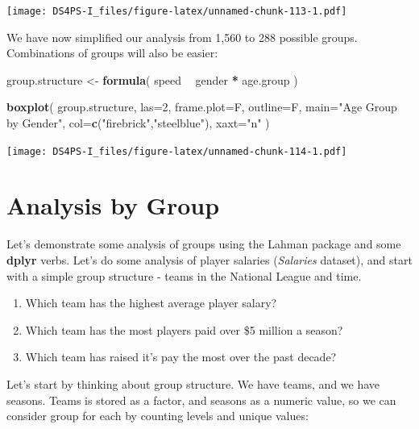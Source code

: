 \documentclass[]{book}
\newenvironment{Shaded}{\begin{snugshade}}{\end{snugshade}}
\newcommand{\DataTypeTok}[1]{\textcolor[rgb]{0.13,0.29,0.53}{#1}}
\newcommand{\DecValTok}[1]{\textcolor[rgb]{0.00,0.00,0.81}{#1}}
\newcommand{\KeywordTok}[1]{\textcolor[rgb]{0.13,0.29,0.53}{\textbf{#1}}}
\newcommand{\NormalTok}[1]{#1}
\newcommand{\OperatorTok}[1]{\textcolor[rgb]{0.81,0.36,0.00}{\textbf{#1}}}
\newcommand{\StringTok}[1]{\textcolor[rgb]{0.31,0.60,0.02}{#1}}
\providecommand{\tightlist}{%
  \setlength{\itemsep}{0pt}\setlength{\parskip}{0pt}}
\theoremstyle{definition}
\theoremstyle{definition}
\theoremstyle{definition}
\theoremstyle{remark}
\begin{document}
\texttt{[image: DS4PS-I\_files/figure-latex/unnamed-chunk-113-1.pdf]}

We have now simplified our analysis from 1,560 to 288 possible groups.
Combinations of groups will also be easier:

\begin{Shaded}
\begin{Highlighting}[]
\NormalTok{group.structure <-}\StringTok{ }\KeywordTok{formula}\NormalTok{( speed }\OperatorTok{~}\StringTok{ }\NormalTok{gender }\OperatorTok{*}\StringTok{ }\NormalTok{age.group )}

\KeywordTok{boxplot}\NormalTok{( group.structure, }
         \DataTypeTok{las=}\DecValTok{2}\NormalTok{, }\DataTypeTok{frame.plot=}\NormalTok{F, }\DataTypeTok{outline=}\NormalTok{F, }\DataTypeTok{main=}\StringTok{"Age Group by Gender"}\NormalTok{,}
         \DataTypeTok{col=}\KeywordTok{c}\NormalTok{(}\StringTok{"firebrick"}\NormalTok{,}\StringTok{"steelblue"}\NormalTok{), }\DataTypeTok{xaxt=}\StringTok{"n"}\NormalTok{ )}
\end{Highlighting}
\end{Shaded}

\texttt{[image: DS4PS-I\_files/figure-latex/unnamed-chunk-114-1.pdf]}

\hypertarget{analysis-by-group}{%
\section{Analysis by Group}\label{analysis-by-group}}

Let's demonstrate some analysis of groups using the Lahman package and
some \textbf{dplyr} verbs. Let's do some analysis of player salaries
(\emph{Salaries} dataset), and start with a simple group structure -
teams in the National League and time.

\begin{enumerate}
\def\labelenumi{\arabic{enumi}.}
\tightlist
\item
  Which team has the highest average player salary?
\item
  Which team has the most players paid over \$5 million a season?
\item
  Which team has raised it's pay the most over the past decade?
\end{enumerate}

Let's start by thinking about group structure. We have teams, and we
have seasons. Teams is stored as a factor, and seasons as a numeric
value, so we can consider group for each by counting levels and unique
values:
\end{document}
